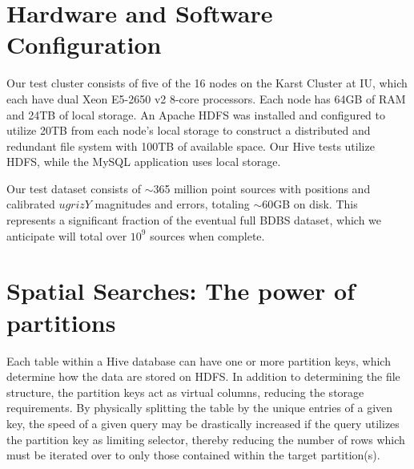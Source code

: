 \documentclass[11pt,twoside]{article}
\begin{document}
\section{Hardware and Software Configuration}

Our test cluster consists of five of the 16 nodes on the Karst Cluster at IU, which each have dual Xeon
E5-2650 v2 8-core processors. Each node has 64GB of RAM and 24TB of local storage. An Apache HDFS was
installed and configured to utilize 20TB from each node's local storage to construct a distributed and
redundant file system with 100TB of available space.  Our Hive tests utilize HDFS, while the MySQL application
uses local storage.

Our test dataset consists of $\sim$365 million point sources with positions and calibrated $ugrizY$ magnitudes
and errors, totaling $\sim$60GB on disk.  This represents a significant fraction of the eventual full BDBS
dataset, which we anticipate will total over $10^9$ sources when complete.



\section{Spatial Searches: The power of partitions}
\label{spatial}
Each table within a Hive database can have one or more partition keys, which determine how the data are stored
on HDFS.  In addition to determining the file structure, the partition keys act as virtual columns, reducing
the storage requirements.  By physically splitting the table by the unique entries of a given key, the speed
of a given query may be drastically increased if the query utilizes the partition key as limiting selector,
thereby reducing the number of rows which must be iterated over to only those contained within the target
partition(s).
\end{document}
